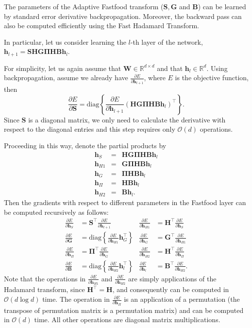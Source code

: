 \documentclass[10pt,twocolumn,letterpaper]{article}
\newcommand{\myvec}[1]{\mathbf{#1}}
\newcommand{\myvecsym}[1]{\boldsymbol{#1}}
\newcommand{\vPi}{\myvecsym{\Pi}}
\newcommand{\vh}{\myvec{h}}
\newcommand{\vB}{\myvec{B}}
\newcommand{\vG}{\myvec{G}}
\newcommand{\vH}{\myvec{H}}
\newcommand{\vS}{\myvec{S}}
\newcommand{\vW}{\myvec{W}}
\newcommand{\diag}{\mathrm{diag}}
\newcommand{\bea}{\begin{eqnarray}}
\newcommand{\eea}{\end{eqnarray}}
\newcommand{\cbr}[1]{\left\{#1\right\}}
\newcommand{\RR}{\mathbb{R}}
\begin{document}
The parameters of the Adaptive Fastfood transform ($\vS, \vG$ and  $\vB$) can be learned by standard error derivative backpropagation. Moreover, the backward pass can also be computed efficiently using the Fast Hadamard Transform.

In particular, let us consider learning the $l$-th layer of the network,
$\vh_{l+1} = \vS\vH\vG\vPi \vH\vB \vh_{l}$.


For simplicity, let us again assume that 
$\vW \in \mathbb{R}^{d\times d}$ and that $\vh_{l} \in \RR^{d}$. Using backpropagation,
assume we already have $\frac{\partial E}{\partial \vh_{l+1}}$, where
$E$ is the objective function, then
\begin{equation}
  \frac{\partial E}{\partial \vS} = \diag \cbr{\frac{\partial E}{\partial \vh_{l+1}}
  (\vH \vG \vPi \vH \vB \vh_{l})^{\top}}.
\end{equation}
Since $\vS$ is a diagonal matrix, we only need to calculate the derivative with respect to 
the diagonal entries and this step requires only $\mathcal{O}(d)$ operations.

Proceeding in this way, denote the partial products by
\bea
\vh_{S} &=& \vH \vG \vPi \vH \vB \vh_{l} \nonumber \\
\vh_{H1} &=& \vG \vPi \vH \vB \vh_{l}\nonumber \\
\vh_{G} &=& \vPi \vH \vB \vh_{l}\nonumber \\
\vh_{\Pi} &=& \vH \vB \vh_{l}\nonumber \\
\vh_{H2} &=& \vB \vh_{l}. 
\eea
Then the gradients with respect to different parameters in the Fastfood layer can be computed recursively as follows:
\begin{align}
  \frac{\partial E}{\partial \vh_{S}} & = \vS^{\top}\frac{\partial
                                      E}{\partial \vh_{l+1}} &
  \frac{\partial E}{\partial \vh_{H1}} & = \vH^{\top}\frac{\partial E}{\partial
    \vh_{S}} \nonumber \\
  \frac{\partial E}{\partial \vG} & = \diag \cbr{\frac{\partial E}{\partial \vh_{H1}}
    \vh_{G}^{\top}} &
  \frac{\partial E}{\partial \vh_{G}} & = \vG^{\top}\frac{\partial E}{\partial
    \vh_{H1}} \nonumber \\
  \frac{\partial E}{\partial \vh_{\Pi}} & = \vPi^{\top} \frac{\partial
                                        E}{\partial \vh_{G}} &
  \frac{\partial E}{\partial \vh_{H2}} & = \vH^{\top}\frac{\partial E}{\partial
    \vh_{\Pi}} \nonumber \\
  \frac{\partial E}{\partial \vB} & = \diag \cbr{\frac{\partial E}{\partial
    \vh_{H2}} \vh_{l}^{\top} } &
  \frac{\partial E}{\partial \vh_{l}} & = \vB^{\top}\frac{\partial E}{\partial
    \vh_{H2}}.
\end{align}
Note that the operations in $\frac{\partial E}{\partial \vh_{H1}}$ and
$\frac{\partial E}{\partial \vh_{H2}}$ are simply applications of the Hadamard
transform, since $\vH^\top = \vH$, and consequently can be computed in $\mathcal{O}(d\log d)$
time. The operation in $\frac{\partial E}{\partial \vh_{\Pi}}$ is an application
of a permutation (the transpose of permutation matrix is a permutation matrix)
and can be computed in $\mathcal{O}(d)$ time. All other operations are diagonal matrix
multiplications. 
\end{document}

